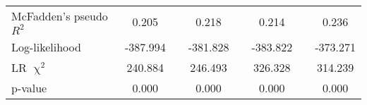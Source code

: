 \begin{table}[htbp]
{\begin{tabular}{lcccccccccccc}
    McFadden's pseudo $R^2$ & 0.205 &       & \multicolumn{2}{c}{0.218} &       & \multicolumn{2}{c}{0.214} &       & \multicolumn{4}{c}{0.236} \\
    Log-likelihood & -387.994 &       & \multicolumn{2}{c}{-381.828} &       & \multicolumn{2}{c}{-383.822} &       & \multicolumn{4}{c}{-373.271} \\
    LR $\upchi^2$ & 240.884 &       & \multicolumn{2}{c}{246.493} &       & \multicolumn{2}{c}{326.328} &       & \multicolumn{4}{c}{314.239} \\
    p-value & 0.000 &       & \multicolumn{2}{c}{0.000} &       & \multicolumn{2}{c}{0.000} &       & \multicolumn{4}{c}{0.000} \\
    \bottomrule

    \end{tabular}%
	}
  \label{tab:ame_indebt}%
\end{table}%